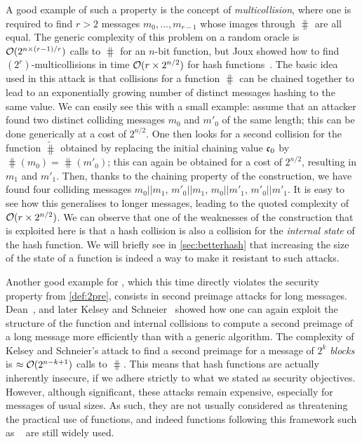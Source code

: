 A good example of such a property is the concept of \emph{multicollision}, where one is required to find $r > 2$ messages $m_{0},\ldots,m_{r-1}$ whose images through $\hash$
are all equal. The generic complexity of this problem on a random oracle is $\operatorname{\mathcal{O}}(2^{n\times (r-1)/r})$ calls to $\hash$ for an $n$-bit function, but Joux showed how to
find $(2^r)$-multicollisions in time $\operatorname{\mathcal{O}}(r\times 2^{n/2})$ for \merkdam hash functions~\cite{DBLP:conf/crypto/Joux04}.
The basic idea used in this attack is that collisions for a \merkdam function $\hash$ can be chained together to lead to an exponentially growing number of distinct messages hashing
to the same value. We can easily see this with a small example: assume that an attacker found two distinct colliding messages $m_0$ and $m'_0$ of the same length;
this can be done generically at a cost of $2^{n/2}$. One then looks for a second collision for the function $\widetilde \hash$ obtained by replacing the initial chaining
value $\mathfrak{c}_0$ by $\hash(m_0) = \hash(m'_0)$; this can again be obtained for a cost of $2^{n/2}$, resulting in $m_1$ and $m'_1$. Then, thanks to
the chaining property of the \merkdam construction, we have found four colliding messages $m_0||m_1$, $m'_0||m_1$, $m_0||m'_1$, $m'_0||m'_1$.
It is easy to see how this generalises to longer messages, leading to the quoted complexity of $\operatorname{\mathcal{O}}(r \times 2^{n/2})$.
We can observe that one of the weaknesses of the construction that is exploited here is that a hash collision is also
a collision for the \emph{internal state} of the hash function. We will briefly see in \autoref{sec:betterhash} that increasing the size of the state of a function is indeed a way to make it resistant
to such attacks.

Another good example for \merkdam, which this time directly violates the security property from \autoref{def:2pre}, consists in second preimage attacks for long messages.
Dean~\cite{dean}, and later Kelsey and Schneier~\cite{DBLP:conf/eurocrypt/KelseyS05} showed how one can again exploit the structure of the function and internal collisions to compute a second preimage
of a long message more efficiently than with a generic algorithm. The complexity of Kelsey and Schneier's attack to find a second preimage for a message
of $2^k$ \emph{blocks} is $\approx \operatorname{\mathcal{O}}(2^{n-k+1})$ calls to $\hash$. This means that \merkdam hash functions are actually inherently insecure, if we adhere
strictly to what we stated as security objectives. However, although significant, these attacks remain expensive, especially for messages of usual sizes. As such, they are not usually considered as threatening
the practical use of \merkdam functions, and indeed functions following this framework such as \shatwo~\cite{Nist-SHA} are still widely used.

